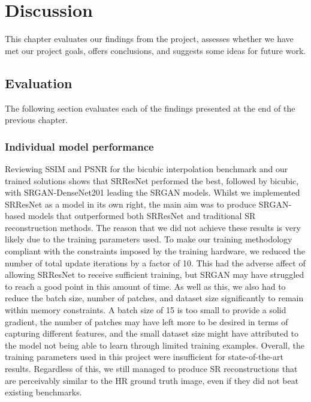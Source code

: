 \chapter{Discussion}
\label{chapter4}
This chapter evaluates our findings from the project, assesses whether we have met our project goals, offers conclusions, and suggests some ideas for future work.

\section{Evaluation}
The following section evaluates each of the findings presented at the end of the previous chapter.

\subsection{Individual model performance}
Reviewing SSIM and PSNR for the bicubic interpolation benchmark and our trained solutions shows that SRResNet performed the best, followed by bicubic, with SRGAN-DenseNet201 leading the SRGAN models. Whilst we implemented SRResNet as a model in its own right, the main aim was to produce SRGAN-based models that outperformed both SRResNet and traditional SR reconstruction methods. The reason that we did not achieve these results is very likely due to the training parameters used. To make our training methodology compliant with the constraints imposed by the training hardware, we reduced the number of total update iterations by a factor of 10. This had the adverse affect of allowing SRResNet to receive sufficient training, but SRGAN may have struggled to reach a good point in this amount of time. As well as this, we also had to reduce the batch size, number of patches, and dataset size significantly to remain within memory constraints. A batch size of 15 is too small to provide a solid gradient, the number of patches may have left more to be desired in terms of capturing different features, and the small dataset size might have attributed to the model not being able to learn through limited training examples. Overall, the training parameters used in this project were insufficient for state-of-the-art results. Regardless of this, we still managed to produce SR reconstructions that are perceivably similar to the HR ground truth image, even if they did not beat existing benchmarks.

